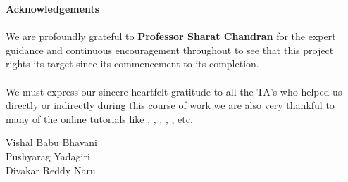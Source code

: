 \begin{center}
\thispagestyle{empty}
\LARGE{\textbf{Acknowledgements}}\\[1cm]
\end{center}
\linespread{1.13}
\large{\paragraph{}We are profoundly grateful to \textbf{Professor Sharat Chandran} for the expert guidance
and continuous encouragement throughout to see that this project rights its
target since its commencement to its completion.}
\large{\paragraph{}We must express our sincere heartfelt gratitude to all the TA's who helped us directly or indirectly during this course of work
we are also very thankful to many of the online tutorials like \cite{Box2DforFlashGames}, \cite{Box2Dlinks}, \cite{Sharelatexlinks}, \cite{csslinks}, \cite{Bessierlinks}, \cite{Tizen} etc.
}

\begin{flushright}
{
Vishal Babu Bhavani\\
Pushyarag Yadagiri\\
Divakar Reddy Naru\\

}
\end{flushright}
\newpage
